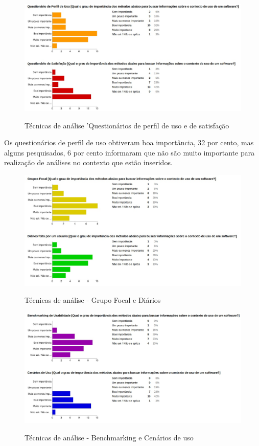 	\begin{figure}[!h]
    	\centering
    	\includegraphics[keepaspectratio=true,scale=0.55]
      		{figuras/analise3.eps}
    	\label{check04}
		\caption{Técnicas de análise 'Questionários de perfil de uso e de satisfação}
	\end{figure}
	
	Os questionários de perfil de uso obtiveram boa importância, 32 por cento, mas alguns pesquisados, 6 por cento informaram que não são muito importante para realização de análises no contexto que estão inseridos.
	
	\begin{figure}[!h]
    	\centering
    	\includegraphics[keepaspectratio=true,scale=0.55]
      		{figuras/analise4.eps}
    	\label{check04}
		\caption{Técnicas de análise - Grupo Focal e Diários}
	\end{figure}
	
	
	\begin{figure}[!h]
    	\centering
    	\includegraphics[keepaspectratio=true,scale=0.55]
      		{figuras/analise5.eps}
    	\label{check04}
		\caption{Técnicas de análise - Benchmarking e Cenários de uso}
	\end{figure}
		
